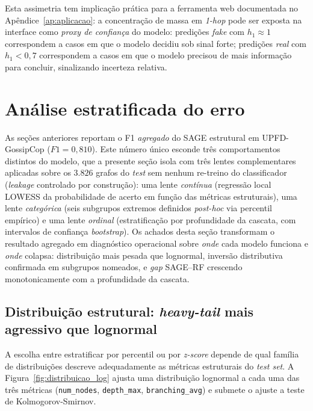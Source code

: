 Esta assimetria tem implica\c{c}\~ao pr\'atica para a ferramenta web
documentada no Ap\^endice~\ref{ap:aplicacao}: a concentra\c{c}\~ao de
massa em \emph{1-hop} pode ser exposta na interface como
\emph{proxy de confian\c{c}a} do modelo: predi\c{c}\~oes \emph{fake}
com $h_1 \approx 1$ correspondem a casos em que o modelo decidiu sob
sinal forte; predi\c{c}\~oes \emph{real} com $h_1 < 0{,}7$ correspondem
a casos em que o modelo precisou de mais informa\c{c}\~ao para concluir,
sinalizando incerteza relativa.

\section{An\'alise estratificada do erro}
\label{sec:estratificacao}

As se\c{c}\~oes anteriores reportam o F1 \emph{agregado} do SAGE estrutural em UPFD-GossipCop ($F1 = 0{,}810$). Este n\'umero \'unico esconde
tr\^es comportamentos distintos do modelo, que a presente se\c{c}\~ao
isola com tr\^es lentes complementares aplicadas sobre os $3.826$
grafos do \emph{test} sem nenhum re-treino do classificador
(\emph{leakage} controlado por constru\c{c}\~ao): uma lente
\emph{cont\'inua} (regress\~ao local LOWESS da probabilidade de acerto
em fun\c{c}\~ao das m\'etricas estruturais), uma lente \emph{categ\'orica}
(seis subgrupos extremos definidos \emph{post-hoc} via percentil
emp\'irico) e uma lente \emph{ordinal} (estratifica\c{c}\~ao por
profundidade da cascata, com intervalos de confian\c{c}a \emph{bootstrap}).
Os achados desta se\c{c}\~ao transformam o resultado agregado em diagn\'ostico
operacional sobre \emph{onde} cada modelo funciona e \emph{onde} colapsa:
distribui\c{c}\~ao mais pesada que lognormal, invers\~ao distributiva
confirmada em subgrupos nomeados, e \emph{gap} SAGE--RF crescendo
monotonicamente com a profundidade da cascata.

\subsection{Distribui\c{c}\~ao estrutural: \emph{heavy-tail} mais agressivo que lognormal}
\label{sec:estrat_distribuicao}

A escolha entre estratificar por percentil ou por \emph{z-score} depende
de qual fam\'ilia de distribui\c{c}\~oes descreve adequadamente as
m\'etricas estruturais do \emph{test set}. A
Figura~\ref{fig:distribuicao_log} ajusta uma distribui\c{c}\~ao lognormal
a cada uma das tr\^es m\'etricas (\texttt{num\_nodes},
\texttt{depth\_max}, \texttt{branching\_avg}) e submete o ajuste a teste
de Kolmogorov-Smirnov.

